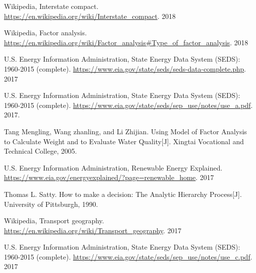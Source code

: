 \documentclass[a4paper,11pt]{article}
\begin{document}
\newpage%
\thispagestyle{empty}%
\begin{thebibliography}{}
%
%
Wikipedia, Interstate compact. \url{https://en.wikipedia.org/wiki/Interstate_compact}. 2018

Wikipedia, Factor analysis. \url{https://en.wikipedia.org/wiki/Factor_analysis#Type_of_factor_analysis}. 2018

U.S. Energy Information Administration, State Energy Data System (SEDS): 1960-2015 (complete). \url{https://www.eia.gov/state/seds/seds-data-complete.php}. 2017

U.S. Energy Information Administration, State Energy Data System (SEDS): 1960-2015 (complete). \url{https://www.eia.gov/state/seds/sep_use/notes/use_a.pdf}. 2017.

Tang Mengling, Wang zhanling, and Li Zhijian. Using Model of Factor Analysis to Calculate Weight and to Evaluate Water Quality[J]. Xingtai Vocational and Technical College, 2005.

U.S. Energy Information Administration, Renewable Energy Explained. \url{https://www.eia.gov/energyexplained/?page=renewable_home}. 2017


Thomas L. Satty. How to make a decision: The Analytic Hierarchy Process[J]. University of Pittsburgh, 1990.

Wikipedia, Transport geography. \url{https://en.wikipedia.org/wiki/Transport_geography}. 2017

U.S. Energy Information Administration, State Energy Data System (SEDS): 1960-2015 (complete). \url{https://www.eia.gov/state/seds/sep_use/notes/use_c.pdf}. 2017


\end{thebibliography}
\end{document}
